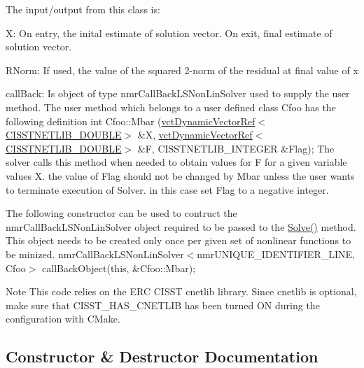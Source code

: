 The input/output from this class is\+:
\begin{DoxyItemize}
\item X\+: On entry, the inital estimate of solution vector. On exit, final estimate of solution vector.
\item R\+Norm\+: If used, the value of the squared 2-\/norm of the residual at final value of x
\item call\+Back\+: Is object of type nmr\+Call\+Back\+L\+S\+Non\+Lin\+Solver used to supply the user method. The user method which belongs to a user defined class \textquotesingle{}Cfoo\textquotesingle{} has the following definition int Cfoo\+::\+Mbar (\hyperlink{classvct_dynamic_vector_ref}{vct\+Dynamic\+Vector\+Ref$<$\+C\+I\+S\+S\+T\+N\+E\+T\+L\+I\+B\+\_\+\+D\+O\+U\+B\+L\+E$>$} \&X, \hyperlink{classvct_dynamic_vector_ref}{vct\+Dynamic\+Vector\+Ref$<$\+C\+I\+S\+S\+T\+N\+E\+T\+L\+I\+B\+\_\+\+D\+O\+U\+B\+L\+E$>$} \&F, C\+I\+S\+S\+T\+N\+E\+T\+L\+I\+B\+\_\+\+I\+N\+T\+E\+G\+E\+R \&Flag); The solver calls this method when needed to obtain values for F for a given variable values X. the value of Flag should not be changed by Mbar unless the user wants to terminate execution of Solver. in this case set Flag to a negative integer.

The following constructor can be used to contruct the nmr\+Call\+Back\+L\+S\+Non\+Lin\+Solver object required to be passed to the \hyperlink{classnmr_l_s_non_lin_solver_a79af0b924ff834cf31df5e20ae261c59}{Solve()} method. This object needs to be created only once per given set of nonlinear functions to be minized. nmr\+Call\+Back\+L\+S\+Non\+Lin\+Solver$<$nmr\+U\+N\+I\+Q\+U\+E\+\_\+\+I\+D\+E\+N\+T\+I\+F\+I\+E\+R\+\_\+\+L\+I\+N\+E, Cfoo$>$ call\+Back\+Object(this, \&\+Cfoo\+::\+Mbar);
\end{DoxyItemize}

\begin{DoxyNote}{Note}
This code relies on the E\+R\+C C\+I\+S\+S\+T cnetlib library. Since cnetlib is optional, make sure that C\+I\+S\+S\+T\+\_\+\+H\+A\+S\+\_\+\+C\+N\+E\+T\+L\+I\+B has been turned O\+N during the configuration with C\+Make. 
\end{DoxyNote}


\subsection{Constructor \& Destructor Documentation}
\hypertarget{classnmr_l_s_non_lin_solver_abe9e4c062db3cfc45144fcba00e5f980}{}
